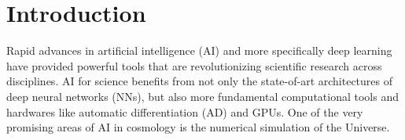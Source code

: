 \documentclass[modern, trackchanges, dvipsnames]{aastex631}
\begin{document}
\vspace{1em}
\section{Introduction}
\label{sec:intro}

Rapid advances in artificial intelligence (AI) and more specifically
deep learning have provided powerful tools that are revolutionizing
scientific research across disciplines.
AI for science benefits from not only the state-of-art architectures of
deep neural networks (NNs), but also more fundamental computational
tools and hardwares like automatic differentiation (AD) and GPUs.
One of the very promising areas of AI in cosmology is the numerical
simulation of the Universe.

\end{document}
